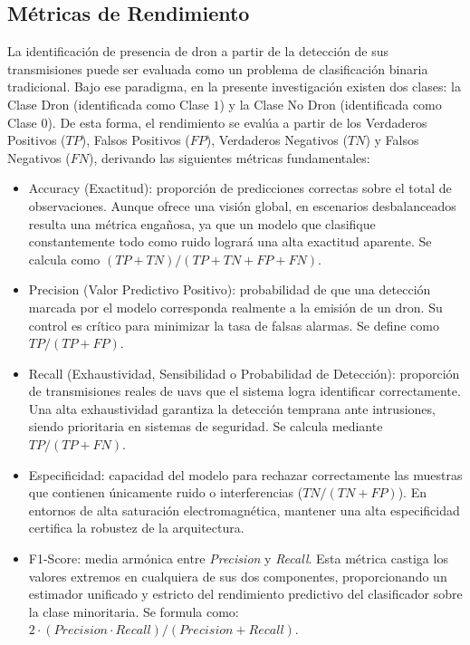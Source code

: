 \subsection{Métricas de Rendimiento}
\label{subsec:eval_metricas}
La identificación de presencia de dron a partir de la detección de sus transmisiones puede ser evaluada como un problema de clasificación binaria tradicional. Bajo ese paradigma, en la presente investigación existen dos clases: la Clase Dron (identificada como Clase $1$) y la Clase No Dron (identificada como Clase $0$). De esta forma, el rendimiento se evalúa a partir de los Verdaderos Positivos ($TP$), Falsos Positivos ($FP$), Verdaderos Negativos ($TN$) y Falsos Negativos ($FN$), derivando las siguientes métricas fundamentales:
\begin{itemize}
    \item Accuracy (Exactitud): proporción de predicciones correctas sobre el total de observaciones. Aunque ofrece una visión global, en escenarios desbalanceados resulta una métrica engañosa, ya que un modelo que clasifique constantemente todo como ruido logrará una alta exactitud aparente. Se calcula como $(TP + TN) / (TP + TN + FP + FN)$.
    
    \item Precision (Valor Predictivo Positivo): probabilidad de que una detección marcada por el modelo corresponda realmente a la emisión de un dron. Su control es crítico para minimizar la tasa de falsas alarmas. Se define como $TP / (TP + FP)$.
    
    \item Recall (Exhaustividad, Sensibilidad o Probabilidad de Detección): proporción de transmisiones reales de \gls{uav}s que el sistema logra identificar correctamente. Una alta exhaustividad garantiza la detección temprana ante intrusiones, siendo prioritaria en sistemas de seguridad. Se calcula mediante $TP / (TP + FN)$.
    
    \item Especificidad: capacidad del modelo para rechazar correctamente las muestras que contienen únicamente ruido o interferencias ($TN / (TN + FP)$). En entornos de alta saturación electromagnética, mantener una alta especificidad certifica la robustez de la arquitectura.
    
    \item F1-Score: media armónica entre \textit{Precision} y \textit{Recall}. Esta métrica castiga los valores extremos en cualquiera de sus dos componentes, proporcionando un estimador unificado y estricto del rendimiento predictivo del clasificador sobre la clase minoritaria. Se formula como: \\ 
    $2 \cdot (Precision \cdot Recall) / (Precision + Recall)$.
\end{itemize}

